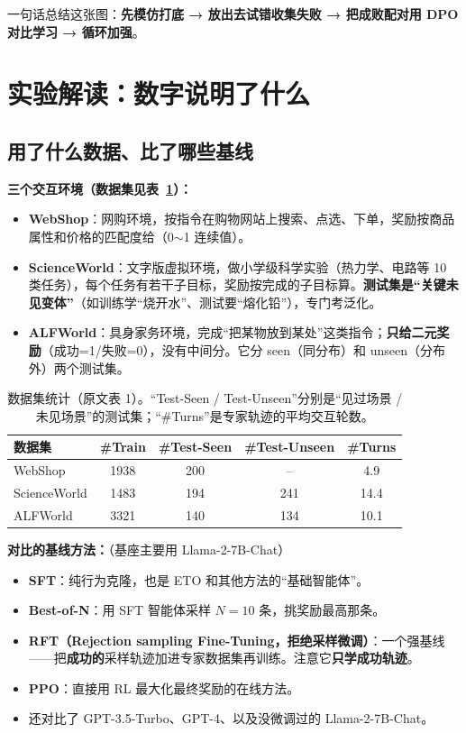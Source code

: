 \documentclass[11pt,UTF8,fontset=fandol]{ctexart}
\begin{document}
一句话总结这张图：\textbf{先模仿打底 → 放出去试错收集失败 → 把成败配对用 DPO 对比学习 → 循环加强}。

\section{实验解读：数字说明了什么}

\subsection{用了什么数据、比了哪些基线}

\textbf{三个交互环境（数据集见表~\ref{tab:data}）：}
\begin{itemize}[leftmargin=2em,itemsep=2pt]
\item \textbf{WebShop}：网购环境，按指令在购物网站上搜索、点选、下单，奖励按商品属性和价格的匹配度给（0$\sim$1 连续值）。
\item \textbf{ScienceWorld}：文字版虚拟环境，做小学级科学实验（热力学、电路等 10 类任务），每个任务有若干子目标，奖励按完成的子目标算。\textbf{测试集是“关键未见变体”}（如训练学“烧开水”、测试要“熔化铅”），专门考泛化。
\item \textbf{ALFWorld}：具身家务环境，完成“把某物放到某处”这类指令；\textbf{只给二元奖励}（成功=1/失败=0），没有中间分。它分 seen（同分布）和 unseen（分布外）两个测试集。
\end{itemize}

\begin{table}[H]\centering
\caption{数据集统计（原文表 1）。“Test-Seen / Test-Unseen”分别是“见过场景 / 未见场景”的测试集；“\#Turns”是专家轨迹的平均交互轮数。}
\label{tab:data}
\begin{tabular}{lcccc}
\toprule
数据集 & \#Train & \#Test-Seen & \#Test-Unseen & \#Turns \\
\midrule
WebShop      & 1938 & 200 & --  & 4.9 \\
ScienceWorld & 1483 & 194 & 241 & 14.4 \\
ALFWorld     & 3321 & 140 & 134 & 10.1 \\
\bottomrule
\end{tabular}
\end{table}

\textbf{对比的基线方法：}（基座主要用 Llama-2-7B-Chat）
\begin{itemize}[leftmargin=2em,itemsep=2pt]
\item \textbf{SFT}：纯行为克隆，也是 ETO 和其他方法的“基础智能体”。
\item \textbf{Best-of-N}：用 SFT 智能体采样 $N=10$ 条，挑奖励最高那条。
\item \textbf{RFT（Rejection sampling Fine-Tuning，拒绝采样微调）}：一个强基线——把\textbf{成功的}采样轨迹加进专家数据集再训练。注意它\textbf{只学成功轨迹}。
\item \textbf{PPO}：直接用 RL 最大化最终奖励的在线方法。
\item 还对比了 GPT-3.5-Turbo、GPT-4、以及没微调过的 Llama-2-7B-Chat。
\end{itemize}
\end{document}
